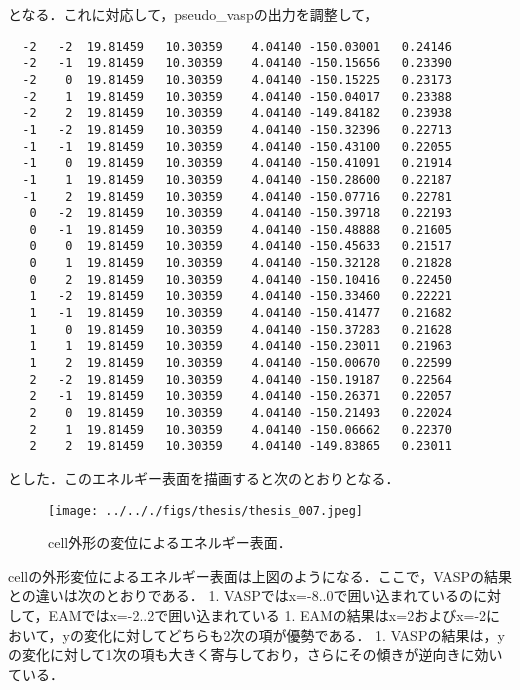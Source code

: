 \documentclass[11pt,dvipdfmx]{jsarticle}
\begin{document}
となる．これに対応して，pseudo\_vaspの出力を調整して，

\begin{verbatim}
  -2   -2  19.81459   10.30359    4.04140 -150.03001   0.24146     
  -2   -1  19.81459   10.30359    4.04140 -150.15656   0.23390     
  -2    0  19.81459   10.30359    4.04140 -150.15225   0.23173     
  -2    1  19.81459   10.30359    4.04140 -150.04017   0.23388     
  -2    2  19.81459   10.30359    4.04140 -149.84182   0.23938     
  -1   -2  19.81459   10.30359    4.04140 -150.32396   0.22713     
  -1   -1  19.81459   10.30359    4.04140 -150.43100   0.22055     
  -1    0  19.81459   10.30359    4.04140 -150.41091   0.21914     
  -1    1  19.81459   10.30359    4.04140 -150.28600   0.22187     
  -1    2  19.81459   10.30359    4.04140 -150.07716   0.22781     
   0   -2  19.81459   10.30359    4.04140 -150.39718   0.22193     
   0   -1  19.81459   10.30359    4.04140 -150.48888   0.21605     
   0    0  19.81459   10.30359    4.04140 -150.45633   0.21517     
   0    1  19.81459   10.30359    4.04140 -150.32128   0.21828     
   0    2  19.81459   10.30359    4.04140 -150.10416   0.22450     
   1   -2  19.81459   10.30359    4.04140 -150.33460   0.22221     
   1   -1  19.81459   10.30359    4.04140 -150.41477   0.21682     
   1    0  19.81459   10.30359    4.04140 -150.37283   0.21628     
   1    1  19.81459   10.30359    4.04140 -150.23011   0.21963     
   1    2  19.81459   10.30359    4.04140 -150.00670   0.22599     
   2   -2  19.81459   10.30359    4.04140 -150.19187   0.22564     
   2   -1  19.81459   10.30359    4.04140 -150.26371   0.22057     
   2    0  19.81459   10.30359    4.04140 -150.21493   0.22024     
   2    1  19.81459   10.30359    4.04140 -150.06662   0.22370     
   2    2  19.81459   10.30359    4.04140 -149.83865   0.23011
\end{verbatim}

とした．このエネルギー表面を描画すると次のとおりとなる．

\begin{figure}[H]
\centering
\begin{center}
\texttt{[image: ../.././figs/thesis/thesis\_007.jpeg]}
\end{center}
\caption{cell外形の変位によるエネルギー表面．\label{spandata-label}}

\label{fig:}
\end{figure}

    cellの外形変位によるエネルギー表面は上図のようになる．ここで，VASPの結果との違いは次のとおりである．
1.
VASPではx=-8..0で囲い込まれているのに対して，EAMではx=-2..2で囲い込まれている
1.
EAMの結果はx=2およびx=-2において，yの変化に対してどちらも2次の項が優勢である．
1.
VASPの結果は，yの変化に対して1次の項も大きく寄与しており，さらにその傾きが逆向きに効いている．
\end{document}
